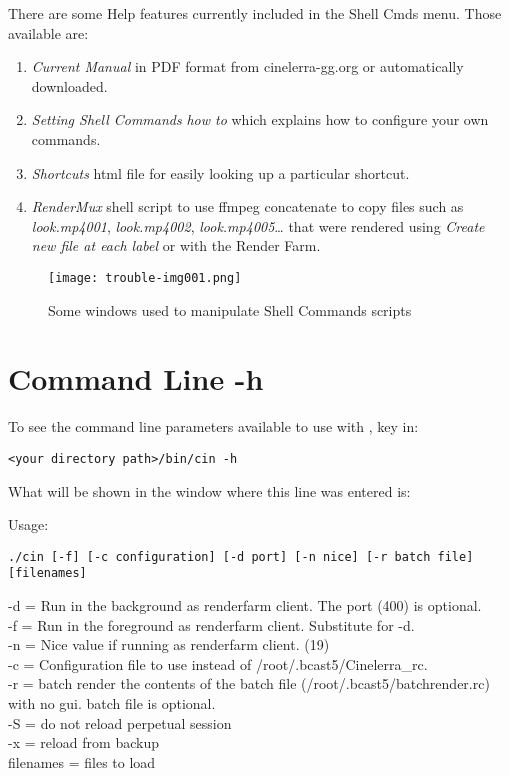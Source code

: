 There are some Help features currently included in the Shell Cmds menu. Those available are:

\begin{enumerate}
	\item \textit{Current Manual} in PDF format from cinelerra-gg.org or automatically downloaded.
	\item \textit{Setting Shell Commands} \textit{how to} which explains how to configure your own commands.
	\item \textit{Shortcuts} html file for easily looking up a particular shortcut.
	\item \textit{RenderMux} shell script to use ffmpeg concatenate to copy files such as \textit{look.mp4001}, \textit{look.mp4002}, \textit{look.mp4005}{\dots} that were rendered using \textit{Create new file at each label} or with the Render Farm.
\end{enumerate}
\clearpage

\begin{figure}[h!]
	\centering
	\texttt{[image: trouble-img001.png]} 
	\caption{Some windows used to manipulate Shell Commands scripts}
	\label{fig:shell_script_manupulation}
\end{figure}

\section{\CGG{} Command Line -h}%
\label{cha:cinelerra_command_line_-h}

To see the command line parameters available to use with \CGG{}, key in:

\qquad \texttt{<your \CGG{} directory path>/bin/cin -h}

What will be shown in the window where this line was entered is:

Usage:

\texttt{./cin [-f] [-c configuration] [-d port] [-n nice] [-r batch file] [filenames]}

-d = Run in the background as renderfarm client.  The port (400) is optional.\\
-f = Run in the foreground as renderfarm client. Substitute for -d.\\
-n = Nice value if running as renderfarm client. (19)\\
-c = Configuration file to use instead of /root/.bcast5/Cinelerra\_rc.\\
-r = batch render the contents of the batch file (/root/.bcast5/batchrender.rc) with no gui. batch file is optional.\\
-S = do not reload perpetual session\\
-x = reload from backup\\
filenames = files to load

